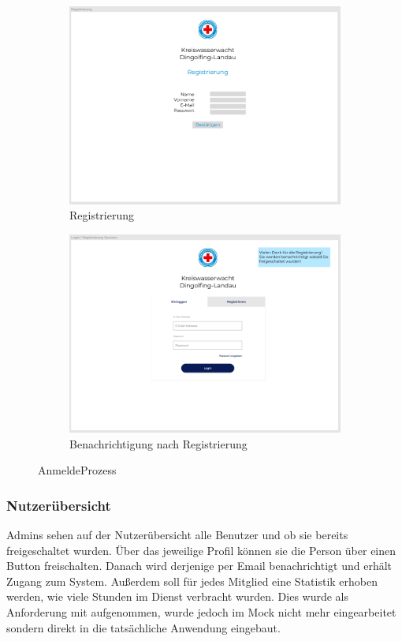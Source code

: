 \documentclass[fontsize=12pt,openright,oneside,paper=a4,BCOR=1cm]{scrbook}
\begin{document}
\begin{figure}[H]
  \centering
  \begin{subfigure}[b]{0.4\linewidth}
    \includegraphics[width=\linewidth]{Anlagen/Figma/2-Registrierung.png}
    \caption{Registrierung}
  \end{subfigure}
  \begin{subfigure}[b]{0.4\linewidth}
    \includegraphics[width=\linewidth]{Anlagen/Figma/3-LoginSuccess.png}
    \caption{Benachrichtigung nach Registrierung}
  \end{subfigure}
  \caption{AnmeldeProzess}
  \label{fig:anmeldeprozess}
\end{figure}

\subsubsection{Nutzerübersicht}
Admins sehen auf der Nutzerübersicht alle Benutzer und ob sie bereits freigeschaltet wurden. Über das jeweilige Profil können sie die Person über einen Button freischalten. Danach wird derjenige per Email benachrichtigt und erhält Zugang zum System. Außerdem soll für jedes Mitglied eine Statistik erhoben werden, wie viele Stunden im Dienst verbracht wurden. Dies wurde als Anforderung mit aufgenommen, wurde jedoch im Mock nicht mehr eingearbeitet sondern direkt in die tatsächliche Anwendung eingebaut.
\end{document}
